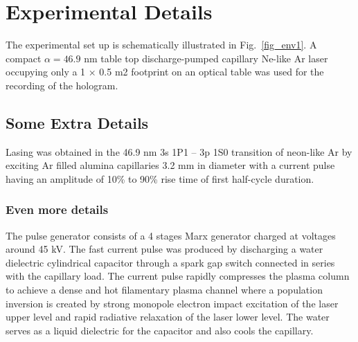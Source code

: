 \documentclass[]{IEEEphot}
\begin{document}


\section{Experimental Details}

 The experimental set up is schematically illustrated in Fig.~\ref{fig_env1}. A compact $\alpha=46.9$ nm table top discharge-pumped capillary Ne-like Ar laser occupying only a 1 × 0.5 m2 footprint on an optical table was used for the recording of the hologram.    


\subsection{Some Extra Details}

 Lasing was obtained in the 46.9 nm 3s 1P1 – 3p 1S0  transition of neon-like Ar by exciting Ar filled alumina capillaries 3.2 mm in diameter with a current pulse having an amplitude of 10\% to 90\% rise time of first half-cycle duration.  

\subsubsection{Even more details}

 The pulse generator consists of a 4 stages Marx generator charged at voltages around 45 kV. The fast current pulse was produced by discharging a water dielectric cylindrical capacitor through a spark gap switch connected in series with the capillary load. The current pulse rapidly compresses the plasma column to achieve a dense and hot filamentary plasma channel where a population inversion is created by strong monopole electron impact excitation of the laser upper level and rapid radiative relaxation of the laser lower level. The water serves as a liquid dielectric for the capacitor and also cools the capillary.  
\end{document}
